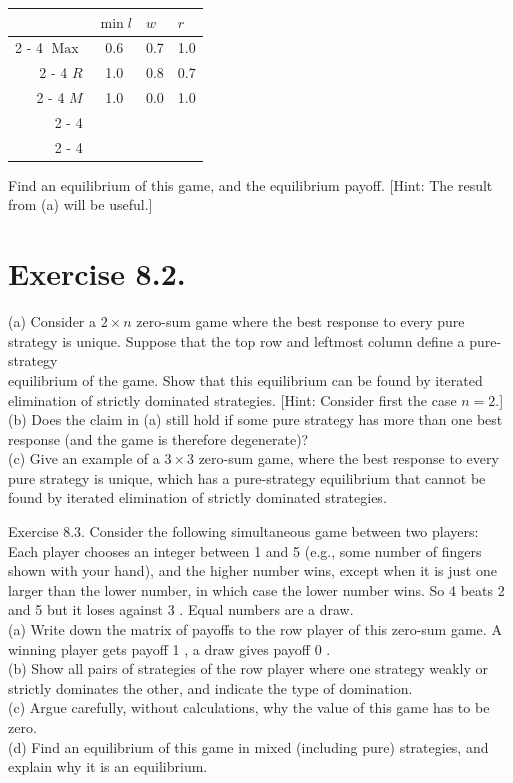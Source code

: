 \documentclass[12pt]{article}
\begin{document}
\begin{center}
\begin{tabular}{r|c|c|c|}
\multicolumn{1}{l}{} & \multicolumn{1}{l}{$\min l$} & \multicolumn{1}{l}{$w$} & \multicolumn{1}{l}{$r$} \\
\cline { 2 - 4 }
$\operatorname{Max}$ & 0.6 & 0.7 & 1.0 \\
\cline { 2 - 4 }
$R$ & 1.0 & 0.8 & 0.7 \\
\cline { 2 - 4 }
$M$ & 1.0 & 0.0 & 1.0 \\
\cline { 2 - 4 }
 &  &  &  \\
\cline { 2 - 4 }
\end{tabular}
\end{center}

Find an equilibrium of this game, and the equilibrium payoff. [Hint: The result from (a) will be useful.]

\section*{Exercise 8.2.}
(a) Consider a $2 \times n$ zero-sum game where the best response to every pure strategy is unique. Suppose that the top row and leftmost column define a pure-strategy\\
equilibrium of the game. Show that this equilibrium can be found by iterated elimination of strictly dominated strategies. [Hint: Consider first the case $n=2$.]\\
(b) Does the claim in (a) still hold if some pure strategy has more than one best response (and the game is therefore degenerate)?\\
(c) Give an example of a $3 \times 3$ zero-sum game, where the best response to every pure strategy is unique, which has a pure-strategy equilibrium that cannot be found by iterated elimination of strictly dominated strategies.

Exercise 8.3. Consider the following simultaneous game between two players: Each player chooses an integer between 1 and 5 (e.g., some number of fingers shown with your hand), and the higher number wins, except when it is just one larger than the lower number, in which case the lower number wins. So 4 beats 2 and 5 but it loses against 3 . Equal numbers are a draw.\\
(a) Write down the matrix of payoffs to the row player of this zero-sum game. A winning player gets payoff 1 , a draw gives payoff 0 .\\
(b) Show all pairs of strategies of the row player where one strategy weakly or strictly dominates the other, and indicate the type of domination.\\
(c) Argue carefully, without calculations, why the value of this game has to be zero.\\
(d) Find an equilibrium of this game in mixed (including pure) strategies, and explain why it is an equilibrium.
\end{document}
